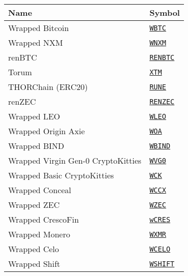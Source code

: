 \begin{tabular}{ll}
\toprule
Name & Symbol \\
\midrule
Wrapped Bitcoin & \href{https://etherscan.io/address/0x2260fac5e5542a773aa44fbcfedf7c193bc2c599}{\tt WBTC} \\
Wrapped NXM & \href{https://etherscan.io/address/0x0d438f3b5175bebc262bf23753c1e53d03432bde}{\tt WNXM} \\
renBTC & \href{https://etherscan.io/address/0xeb4c2781e4eba804ce9a9803c67d0893436bb27d}{\tt RENBTC} \\
Torum & \href{https://etherscan.io/address/0xcd1faff6e578fa5cac469d2418c95671ba1a62fe}{\tt XTM} \\
THORChain (ERC20) & \href{https://etherscan.io/address/0x3155ba85d5f96b2d030a4966af206230e46849cb}{\tt RUNE} \\
renZEC & \href{https://etherscan.io/address/0x1c5db575e2ff833e46a2e9864c22f4b22e0b37c2}{\tt RENZEC} \\
Wrapped LEO & \href{https://etherscan.io/address/0x73a9fb46e228628f8f9bb9004eca4f4f529d3998}{\tt WLEO} \\
Wrapped Origin Axie & \href{https://etherscan.io/address/0xEC0A0915A7c3443862B678B0d4721C7aB133FDCf}{\tt WOA} \\
Wrapped BIND & \href{https://etherscan.io/address/0x15334dcb171e8b65d6650321581dca83be870115}{\tt WBIND} \\
Wrapped Virgin Gen-0 CryptoKitties & \href{https://etherscan.io/address/0x25c7b64a93eb1261e130ec21a3e9918caa38b611}{\tt WVG0} \\
Wrapped Basic CryptoKitties & \href{https://etherscan.io/address/0x09fE5f0236F0Ea5D930197DCE254d77B04128075}{\tt WCK} \\
Wrapped Conceal & \href{https://etherscan.io/address/0x21686F8ce003a95c99aCd297E302FAACf742F7d4}{\tt WCCX} \\
Wrapped ZEC & \href{https://etherscan.io/address/0x4A64515E5E1d1073e83f30cB97BEd20400b66E10}{\tt WZEC} \\
Wrapped CrescoFin & \href{https://etherscan.io/address/0xa0afaa285ce85974c3c881256cb7f225e3a1178a}{\tt wCRES} \\
Wrapped Monero & \href{https://etherscan.io/address/0x465e07d6028830124be2e4aa551fbe12805db0f5}{\tt WXMR} \\
Wrapped Celo & \href{https://etherscan.io/address/0xe452e6ea2ddeb012e20db73bf5d3863a3ac8d77a}{\tt WCELO} \\
Wrapped Shift & \href{https://etherscan.io/address/0x4b4571925e94ccd8c546b39462a270cc9b3ed1e4}{\tt WSHIFT} \\
\bottomrule
\end{tabular}
